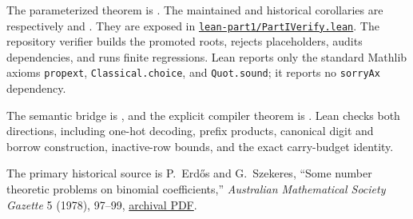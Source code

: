 \documentclass[11pt]{article}
\theoremstyle{remark}
\begin{document}
\begin{flushleft}
The parameterized theorem is
.
The maintained and historical corollaries are respectively
 and
.  They are exposed in
\href{https://github.com/gakonst/nanocodex-erdos700/blob/main/lean-part1/PartIVerify.lean}
{\texttt{lean-part1/PartIVerify.lean}}.  The repository verifier builds the
promoted roots, rejects placeholders, audits dependencies, and runs finite
regressions.  Lean reports only the standard Mathlib axioms
\texttt{propext}, \texttt{Classical.choice}, and \texttt{Quot.sound}; it
reports no \texttt{sorryAx} dependency.

The semantic bridge is
,
and the explicit compiler theorem is
.
Lean checks both directions, including one-hot decoding, prefix products,
canonical digit and borrow construction, inactive-row bounds, and the exact
carry-budget identity.

The primary historical source is P.~Erd\H{o}s and G.~Szekeres,
``Some number theoretic problems on binomial coefficients,''
\emph{Australian Mathematical Society Gazette} 5 (1978), 97--99,
\href{https://www.renyi.hu/~p_erdos/1978-46.pdf}{archival PDF}.
\end{flushleft}
\end{document}
